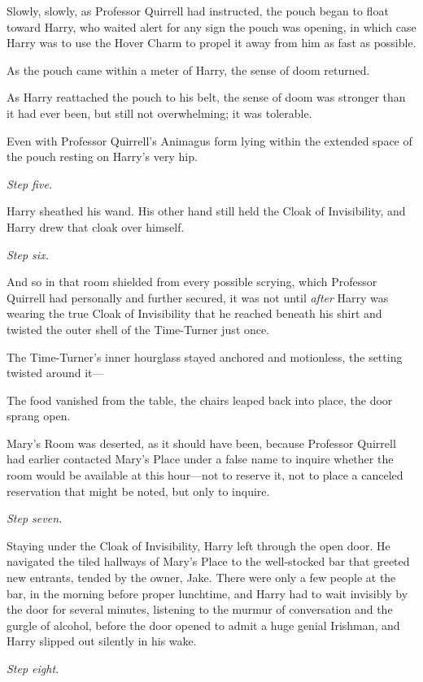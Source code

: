 Slowly, slowly, as Professor Quirrell had instructed, the pouch began to float
toward Harry, who waited alert for any sign the pouch was opening, in which
case Harry was to use the Hover Charm to propel it away from him as fast as
possible.

As the pouch came within a meter of Harry, the sense of doom returned.

As Harry reattached the pouch to his belt, the sense of doom was stronger than
it had ever been, but still not overwhelming; it was tolerable.

Even with Professor Quirrell's Animagus form lying within the extended space of
the pouch resting on Harry's very hip.

\emph{Step five.}

Harry sheathed his wand. His other hand still held the Cloak of Invisibility,
and Harry drew that cloak over himself.

\emph{Step six.}

And so in that room shielded from every possible scrying, which Professor
Quirrell had personally and further secured, it was not until \emph{after}
Harry was wearing the true Cloak of Invisibility that he reached beneath his
shirt and twisted the outer shell of the Time-Turner just once.

The Time-Turner's inner hourglass stayed anchored and motionless, the setting
twisted around it---

The food vanished from the table, the chairs leaped back into place, the door
sprang open.

Mary's Room was deserted, as it should have been, because Professor Quirrell
had earlier contacted Mary's Place under a false name to inquire whether the
room would be available at this hour---not to reserve it, not to place a
canceled reservation that might be noted, but only to inquire.

\emph{Step seven.}

Staying under the Cloak of Invisibility, Harry left through the open door. He
navigated the tiled hallways of Mary's Place to the well-stocked bar that
greeted new entrants, tended by the owner, Jake. There were only a few people
at the bar, in the morning before proper lunchtime, and Harry had to wait
invisibly by the door for several minutes, listening to the murmur of
conversation and the gurgle of alcohol, before the door opened to admit a huge
genial Irishman, and Harry slipped out silently in his wake.

\emph{Step eight.}

